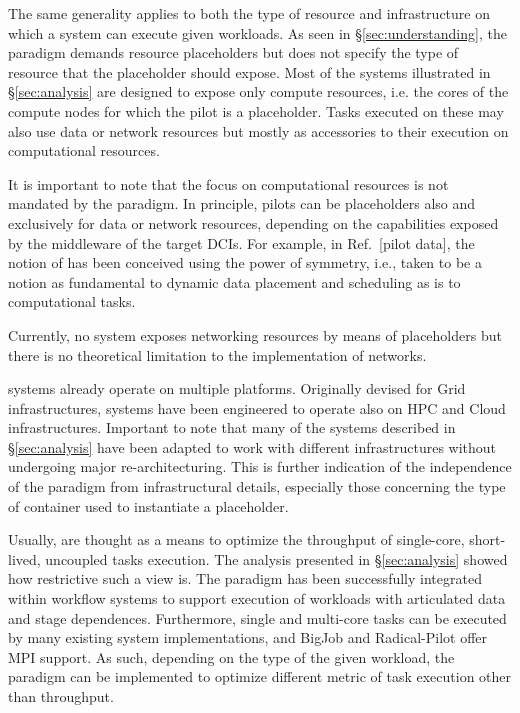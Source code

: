 \documentclass{sig-alternate}
\begin{document}
The same generality applies to both the type of resource and infrastructure on
which a \pilot system can execute given workloads. As seen in
\S\ref{sec:understanding}, the \pilot paradigm demands resource placeholders
but does not specify the type of resource that the placeholder should expose.
Most of the \pilot systems illustrated in \S\ref{sec:analysis} are designed to
expose only compute resources, i.e. the cores of the compute nodes for which
the pilot is a placeholder. Tasks executed on these \pilots may also use data
or network resources but mostly as accessories to their execution on
computational resources.

It is important to note that the focus on computational resources is not
mandated by the \pilot paradigm. In principle, pilots can be placeholders also
and exclusively for data or network resources, depending on the capabilities
exposed by the middleware of the target DCIs. For example, in Ref.~[pilot
data], the notion of \pilotdata has been conceived using the power of symmetry,
i.e., \pilotdata taken to be a notion as fundamental to dynamic data placement
and scheduling as \pilot is to computational tasks.

Currently, no \pilot system exposes networking resources by means of
placeholders but there is no theoretical limitation to the implementation of
\pilot networks.

\pilot systems already operate on multiple platforms. Originally devised for
Grid infrastructures, \pilot systems have been engineered to operate also on
HPC and Cloud infrastructures. Important to note that many of the \pilot
systems described in \S\ref{sec:analysis} have been adapted to work with
different infrastructures without undergoing major re-architecturing. This is
further indication of the independence of the \pilot paradigm from
infrastructural details, especially those concerning the type of container used
to instantiate a placeholder.

Usually, \pilots are thought as a means to optimize the throughput of
single-core, short-lived, uncoupled tasks execution. The analysis presented in
\S\ref{sec:analysis} showed how restrictive such a view is. The \pilot paradigm
has been successfully integrated within workflow systems to support execution
of workloads with articulated data and stage dependences. Furthermore, single
and multi-core tasks can be executed by many existing \pilot system
implementations, and BigJob and Radical-Pilot offer MPI support. As such,
depending on the type of the given workload, the \pilot paradigm can be
implemented to optimize different metric of task execution other than
throughput.
\end{document}
